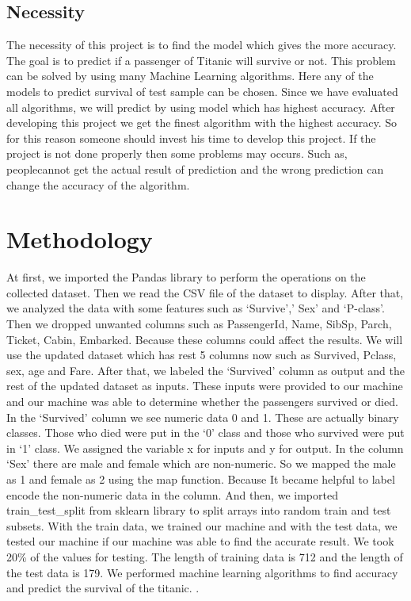 \documentclass[11pt]{article} %
\begin{document}
\subsection{Necessity}
The necessity of this project is to find the model which gives the more accuracy. The goal is to predict if a passenger of Titanic will survive or not.
This problem can be solved by using many Machine Learning algorithms. Here any of the models to predict survival of test sample can be chosen. Since we have evaluated all algorithms, we will predict by using model which has highest accuracy.
After developing this project we get the finest algorithm with the highest accuracy. So for this reason someone should invest his time to develop this project.
 If the project is not done properly then some problems may occurs. Such as, peoplecannot get the actual result of prediction and the wrong prediction can change the accuracy of the algorithm.


\section{Methodology}
At first, we imported the Pandas library to perform the operations on the collected dataset. Then we read the CSV file of the dataset to display. After that, we analyzed the data with some features such as ‘Survive’,’ Sex’ and ‘P-class’. Then we dropped unwanted columns such as PassengerId, Name,  SibSp,  Parch,  Ticket,  Cabin,  Embarked. Because these columns could affect the results. We will use the updated dataset which has rest  5 columns now such as Survived, Pclass, sex, age and Fare.  
After that, we labeled the ‘Survived’ column as output and the rest of the updated dataset as inputs. These inputs were provided to our machine and our machine was able to determine whether the passengers survived or died. In the ‘Survived’ column we see numeric data 0 and 1. These are actually binary classes. Those who died were put in the ‘0’ class and those who survived were put in ‘1’ class.  We assigned the variable x for inputs and y for output. In the column ‘Sex’ there are male and female which are non-numeric. So we mapped the male as 1 and female as 2 using the map function. Because It became helpful to label encode the non-numeric data in the column.
And then, we imported train\_test\_split from sklearn library to split arrays into random train and test subsets. With the train data, we trained our machine and with the test data, we tested our machine if our machine was able to find the accurate result. We took 20\% of the values for testing. The length of training data is 712 and the length of the test data is 179.
We performed machine learning algorithms to find accuracy and predict the survival of the titanic.
.
\end{document}
